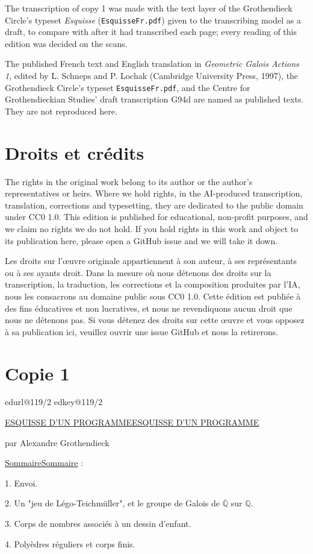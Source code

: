 \documentclass[11pt,a4paper]{article}
\makeatletter
\newif\ifreading
\def\CurrentScanURL{}
\def\CurrentPageKey{}
\def\CurrentCopy{copy1}
\def\CurrentApparatus{}
\newcommand{\EditionPart}[2]{\clearpage\def\CurrentCopy{#1}\section*{#2}}
\newcommand{\scanpage}[1]{%
  \clearpage
  \expandafter\let\expandafter\CurrentScanURL\csname edurl@#1\endcsname
  \expandafter\let\expandafter\CurrentPageKey\csname edkey@#1\endcsname
  \def\CurrentApparatus{}%
  \hypertarget{scan-\CurrentPageKey}{}%
  \typeout{EDITION-SCAN: \CurrentPageKey; PDFPAGE: \the\numexpr\ReadonlyShipoutCounter+1\relax}%
  \ifreading
    \marginnote{\raggedright\scriptsize\sffamily\href{\CurrentScanURL}{119 / \csname edpage@#1\endcsname}}%
  \else
    \noindent{\small\sffamily\href{\CurrentScanURL}{[scan #1]}}\par\smallskip
  \fi}
\let\TextUline\uline
\renewcommand{\uline}[1]{\ifmmode\underline{#1}\else\TextUline{#1}\fi}
\makeatother
\begin{document}
The transcription of copy 1 was made with the text layer of the Grothendieck Circle's typeset \textit{Esquisse} (\texttt{EsquisseFr.pdf}) given to the transcribing model as a draft, to compare with after it had transcribed each page; every reading of this edition was decided on the scans.

The published French text and English translation in \textit{Geometric Galois Actions 1}, edited by L. Schneps and P. Lochak (Cambridge University Press, 1997), the Grothendieck Circle's typeset \texttt{EsquisseFr.pdf}, and the Centre for Grothendieckian Studies' draft transcription G94d are named as published texts. They are not reproduced here.

\section*{Droits et crédits}
The rights in the original work belong to its author or the author's representatives or heirs. Where we hold rights, in the AI-produced transcription, translation, corrections and typesetting, they are dedicated to the public domain under CC0 1.0. This edition is published for educational, non-profit purposes, and we claim no rights we do not hold. If you hold rights in this work and object to its publication here, please open a GitHub issue and we will take it down.

Les droits sur l'œuvre originale appartiennent à son auteur, à ses représentants ou à ses ayants droit. Dans la mesure où nous détenons des droits sur la transcription, la traduction, les corrections et la composition produites par l'IA, nous les consacrons au domaine public sous CC0 1.0. Cette édition est publiée à des fins éducatives et non lucratives, et nous ne revendiquons aucun droit que nous ne détenons pas. Si vous détenez des droits sur cette œuvre et vous opposez à sa publication ici, veuillez ouvrir une issue GitHub et nous la retirerons.
\clearpage

\EditionPart{copy1}{Copie 1}
\scanpage{119/2}
\uline{ESQUISSE D'UN PROGRAMME}

par Alexandre Grothendieck

\uline{Sommaire} :

1. Envoi.

2. Un "jeu de Légo-Teichmüller", et le groupe de Galois de $\overline{\mathbb{Q}}$ sur $\mathbb{Q}$.

3. Corps de nombres associés à un dessin d'enfant.

4. Polyèdres réguliers et corps finis.
\end{document}
